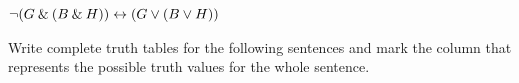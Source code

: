 \begin{earg}
\item ${\neg}(G \mathbin{\&} (B \mathbin{\&} H)) \leftrightarrow (G \vee (B \vee H))$
%


\end{earg}

\problempart
Write complete truth tables for the following sentences and mark the column that represents the possible truth values for the whole sentence.

